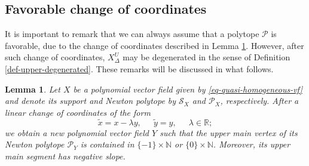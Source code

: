\documentclass[12pt]{amsart}
\newtheorem{lemma}[theorem]{Lemma}
\begin{document}
\subsection{Favorable change of coordinates}

It is important to remark that we can always assume that a polytope $\mathcal{P}$ is favorable, due to the change of coordinates described in Lemma \ref{lemma-preparacao-poligono}. However, after such change of coordinates, $X^{U}_{\Delta}$ may be degenerated in the sense of Definition \ref{def-upper-degenerated}. These remarks will be discussed in what follows.

\begin{lemma}\label{lemma-preparacao-poligono}
Let $X$ be a polynomial vector field given by \eqref{eq-quasi-homogeneous-vf} and denote its support and Newton polytope by $\mathcal{S}_{X}$ and $\mathcal{P}_{X}$, respectively. After a linear change of coordinates of the form
\begin{equation}\label{eq-change-coord-1}
\widetilde{x} = x - \lambda y, \ \quad \ \widetilde{y} = y, \ \quad \ \lambda\in\mathbb{R};
\end{equation}
we obtain a new polynomial vector field $Y$ such that the upper main vertex of its Newton polytope $\mathcal{P}_{Y}$ is contained in $\{-1\}\times\mathbb{N}$ or $\{0\}\times\mathbb{N}$. Moreover, its upper main segment has negative slope.
\end{lemma}
\end{document}
